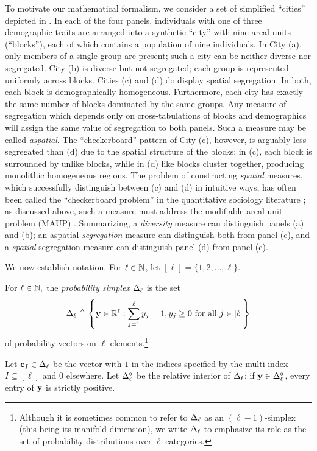 To motivate our mathematical formalism, we consider a set of simplified ``cities'' depicted in . 
In each of the four panels, individuals with one of three demographic traits are arranged into a synthetic ``city'' with nine areal units (``blocks''), each of which contains a population of nine individuals.
In City (a), only members of a single group are present; such a city can be neither diverse nor segregated. 
City (b) is diverse but not segregated; each group is represented uniformly across blocks.
Cities (c) and (d) do display spatial segregation.
In both, each block is demographically homogeneous. 
Furthermore, each city has exactly the same number of blocks dominated by the same groups.
Any measure of segregation which depends only on cross-tabulations of blocks and demographics will assign the same value of segregation to both panels. 
Such a measure may be called \emph{aspatial}. 
The ``checkerboard'' pattern of City (c), however, is arguably less segregated than (d) due to the spatial structure of the blocks: in (c), each block is surrounded by unlike blocks, while in (d) like blocks cluster together, producing monolithic homogeneous regions.  
The problem of constructing \emph{spatial} measures, which successfully distinguish between (c) and (d) in intuitive ways, has often been called the ``checkerboard problem'' in the quantitative sociology literature \cite{reardon3MeasuresSpatial2004}; as discussed above, such a measure must address the modifiable areal unit problem (MAUP) \cite{openshaw1984modifiable}.
Summarizing, a \emph{diversity} measure can distinguish panels (a) and (b); an aspatial \emph{segregation} measure can distinguish both from panel (c), and a \emph{spatial} segregation measure can distinguish panel (d) from panel (c).

We now establish notation. 
For $\ell \in \mathbb{N}$, let $[\ell] = \{1, 2, \ldots, \ell\}$. 
\begin{dfn} \label{def:simplex}
    For $\ell \in \mathbb{N},$ the \emph{probability simplex} $\Delta_{\ell}$ is the set 
    \begin{align*}
        \Delta_{\ell} \triangleq \left\{ \mathbf{y} \in \mathbb{R}^{\ell} : \sum_{j = 1}^{\ell} y_j = 1, y_j \geq 0 \text{ for all } j \in [\ell] \right\}
    \end{align*}
    of probability vectors on $\ell$ elements.\footnote{
      Although it is sometimes common to refer to $\Delta_{\ell}$ as an $(\ell-1)$-simplex (this being its manifold dimension), we write $\Delta_{\ell}$ to emphasize its role as the set of probability distributions over $\ell$ categories.
      } 
\end{dfn}
Let $\mathbf{e}_{I} \in \Delta_{\ell}$ be the vector with $1$ in the indices specified by the multi-index $I \subseteq [\ell]$ and $0$ elsewhere. 
Let $\Delta_{\ell}^{\circ}$ be the relative interior of $\Delta_{\ell}$; if $\mathbf{y} \in \Delta_{\ell}^{\circ}$, every entry of $\mathbf{y}$ is strictly positive. 


